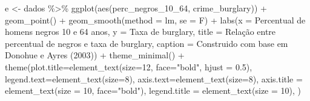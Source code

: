 \documentclass[
]{article}
\newenvironment{Shaded}{\begin{snugshade}}{\end{snugshade}}
\newcommand{\AttributeTok}[1]{\textcolor[rgb]{0.77,0.63,0.00}{#1}}
\newcommand{\DecValTok}[1]{\textcolor[rgb]{0.00,0.00,0.81}{#1}}
\newcommand{\FloatTok}[1]{\textcolor[rgb]{0.00,0.00,0.81}{#1}}
\newcommand{\FunctionTok}[1]{\textcolor[rgb]{0.00,0.00,0.00}{#1}}
\newcommand{\NormalTok}[1]{#1}
\newcommand{\OtherTok}[1]{\textcolor[rgb]{0.56,0.35,0.01}{#1}}
\newcommand{\SpecialCharTok}[1]{\textcolor[rgb]{0.00,0.00,0.00}{#1}}
\newcommand{\StringTok}[1]{\textcolor[rgb]{0.31,0.60,0.02}{#1}}
\begin{document}
\begin{Shaded}
\begin{Highlighting}[]
\NormalTok{e }\OtherTok{\textless{}{-}}\NormalTok{ dados }\SpecialCharTok{\%\textgreater{}\%} 
  \FunctionTok{ggplot}\NormalTok{(}\FunctionTok{aes}\NormalTok{(perc\_negros\_10\_64, crime\_burglary)) }\SpecialCharTok{+}
  \FunctionTok{geom\_point}\NormalTok{() }\SpecialCharTok{+} 
  \FunctionTok{geom\_smooth}\NormalTok{(}\AttributeTok{method =} \StringTok{\textquotesingle{}lm\textquotesingle{}}\NormalTok{, }\AttributeTok{se =}\NormalTok{ F) }\SpecialCharTok{+}
  \FunctionTok{labs}\NormalTok{(}\AttributeTok{x =} \StringTok{\textquotesingle{}Percentual de homens negros 10 e 64 anos\textquotesingle{}}\NormalTok{,}
       \AttributeTok{y =} \StringTok{\textquotesingle{}Taxa de burglary\textquotesingle{}}\NormalTok{,}
       \AttributeTok{title =} \StringTok{\textquotesingle{}Relação entre percentual de negros e taxa de burglary\textquotesingle{}}\NormalTok{,}
       \AttributeTok{caption =} \StringTok{\textquotesingle{}Construido com base em Donohue e Ayres (2003)\textquotesingle{}}\NormalTok{) }\SpecialCharTok{+} 
  \FunctionTok{theme\_minimal}\NormalTok{() }\SpecialCharTok{+}
  \FunctionTok{theme}\NormalTok{(}\AttributeTok{plot.title=}\FunctionTok{element\_text}\NormalTok{(}\AttributeTok{size=}\DecValTok{12}\NormalTok{, }\AttributeTok{face=}\StringTok{"bold"}\NormalTok{, }\AttributeTok{hjust =} \FloatTok{0.5}\NormalTok{),}
        \AttributeTok{legend.text=}\FunctionTok{element\_text}\NormalTok{(}\AttributeTok{size=}\DecValTok{8}\NormalTok{),}
        \AttributeTok{axis.text=}\FunctionTok{element\_text}\NormalTok{(}\AttributeTok{size=}\DecValTok{8}\NormalTok{),}
        \AttributeTok{axis.title =} \FunctionTok{element\_text}\NormalTok{(}\AttributeTok{size =} \DecValTok{10}\NormalTok{, }\AttributeTok{face=}\StringTok{"bold"}\NormalTok{),}
        \AttributeTok{legend.title =} \FunctionTok{element\_text}\NormalTok{(}\AttributeTok{size =} \DecValTok{10}\NormalTok{),}
\NormalTok{        )}


\end{Highlighting}
\end{Shaded}
\end{document}
